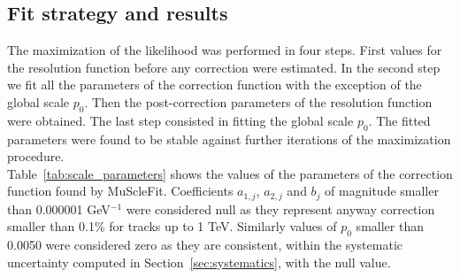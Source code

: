 \subsection{Fit strategy and results}
The maximization of the likelihood was performed in four steps. First
values for the resolution function before any correction were
estimated. In the second step we fit all the parameters of the correction function with
the exception of the global scale $p_0$. Then 
the post-correction parameters of the resolution function were obtained.
The last step consisted in fitting the global scale $p_0$. 
The fitted parameters were found to be stable against further
iterations of the maximization procedure.\\
Table~\ref{tab:scale_parameters} shows the values of the 
parameters of the correction function found by MuScleFit. 
Coefficients $a_{1,j}$, $a_{2,j}$ and $b_j$ of magnitude smaller than
0.000001 GeV$^{-1}$ were considered null as they represent anyway 
correction smaller than 0.1\% for tracks up to 1 TeV. Similarly values
of $p_0$ smaller than 0.0050 were considered zero as they 
are consistent, within the systematic uncertainty 
computed in Section~\ref{sec:systematics}, with the null value.
